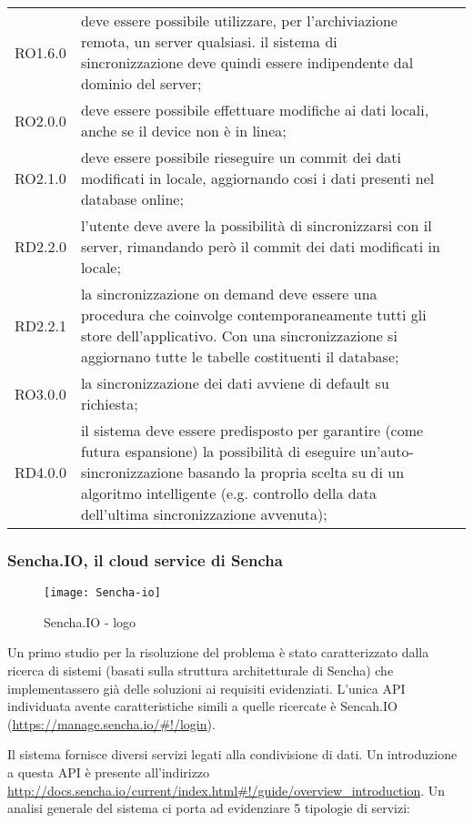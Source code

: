 \documentclass[10pt,a4paper,onecolumn]{article}
\begin{document}
\begin{center}
\begin{longtable}{lp{}l}
RO1.6.0 & deve essere possibile utilizzare, per l'archiviazione remota, un server qualsiasi. il sistema di sincronizzazione deve quindi essere indipendente dal dominio del server;\\
RO2.0.0 & deve essere possibile effettuare modifiche ai dati locali, anche se il device non è in linea;\\
RO2.1.0 & deve essere possibile rieseguire un commit dei dati modificati in locale, aggiornando cosi i dati presenti nel database online;\\
RD2.2.0 & l'utente deve avere la possibilità di sincronizzarsi con il server, rimandando però il commit dei dati modificati in locale;\\
RD2.2.1 & la sincronizzazione on demand deve essere una procedura che coinvolge contemporaneamente tutti gli store dell'applicativo. Con una sincronizzazione si aggiornano tutte le tabelle costituenti il database;\\
RO3.0.0 & la sincronizzazione dei dati avviene di default su richiesta;\\
RD4.0.0 & il sistema deve essere predisposto per garantire (come futura espansione) la possibilità di eseguire un'auto-sincronizzazione basando la propria scelta su di un algoritmo intelligente (e.g. controllo della data dell'ultima sincronizzazione avvenuta);\\
\bottomrule
\end{longtable}
\end{center}

\subsubsection{Sencha.IO, il cloud service di Sencha}

\begin{figure}[h]
	\centering
	\texttt{[image: Sencha-io]}
	\caption{Sencha.IO - logo}						
	\label{fig:senchaIO logo}
\end{figure}

Un primo studio per la risoluzione del problema è stato caratterizzato dalla ricerca di sistemi (basati sulla struttura architetturale di Sencha) che implementassero già delle soluzioni ai requisiti evidenziati. L'unica API individuata avente caratteristiche simili a quelle ricercate è Sencah.IO (\url{https://manage.sencha.io/#!/login}).

Il sistema fornisce diversi servizi legati alla condivisione di dati. Un introduzione a questa API è presente all'indirizzo \url{http://docs.sencha.io/current/index.html#!/guide/overview_introduction}. Un analisi generale del sistema ci porta ad evidenziare 5 tipologie di servizi:
\end{document}
